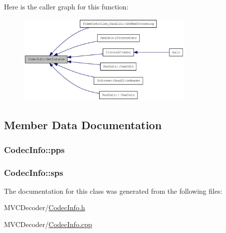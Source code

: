 Here is the caller graph for this function:\nopagebreak
\begin{figure}[H]
\begin{center}
\leavevmode
\includegraphics[width=243pt]{class_codec_info_ad439fd8062a03d868dfe9c9b615b747e_icgraph}
\end{center}
\end{figure}




\subsection{Member Data Documentation}
\hypertarget{class_codec_info_abaa8d84a7d4045129ee64d91eaac4481}{
\subsubsection[{pps}]{ {\bf CodecInfo::pps}}}
\label{class_codec_info_abaa8d84a7d4045129ee64d91eaac4481}
\hypertarget{class_codec_info_aee785011cec77ff3c0c646b498fe1e7d}{
\subsubsection[{sps}]{ {\bf CodecInfo::sps}}}
\label{class_codec_info_aee785011cec77ff3c0c646b498fe1e7d}


The documentation for this class was generated from the following files:\begin{DoxyCompactItemize}
\item 
MVCDecoder/\hyperlink{_codec_info_8h}{CodecInfo.h}\item 
MVCDecoder/\hyperlink{_codec_info_8cpp}{CodecInfo.cpp}\end{DoxyCompactItemize}
